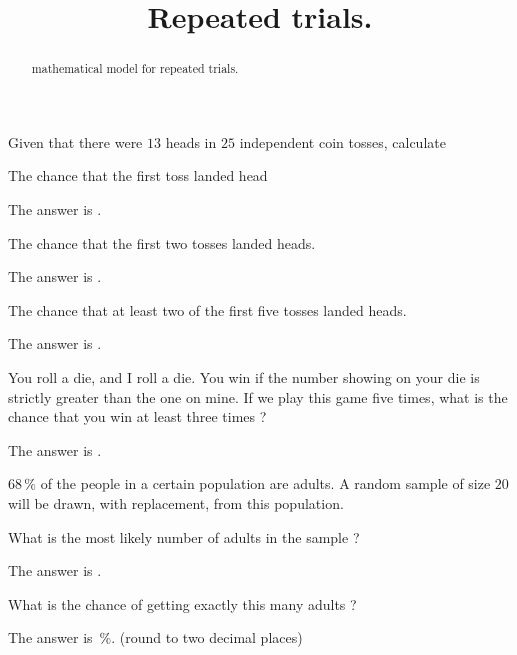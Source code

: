 \documentclass{ximera}
\title{Repeated trials.}
\begin{document}
\begin{abstract}
mathematical model for repeated trials.
\end{abstract}
\maketitle

Given that there were $13$ heads in $25$ independent coin tosses, calculate

\begin{question}
The chance that the first toss landed head
     \begin{solution}
          The answer is .
     \end{solution}
\end{question}

\begin{question}
The chance that the first two tosses landed heads.
     \begin{solution}
          The answer is .
     \end{solution}
\end{question}

\begin{question}
The chance that at least two of the first five tosses landed heads.
     \begin{solution}
          The answer is .
     \end{solution}
\end{question}

\begin{question}
You roll a die, and I roll a die. You win if the number showing on your die is strictly greater than the one on mine. If we play this game five times, what is the chance that you  win at least three times ?
      \begin{solution}
          The answer is .
     \end{solution}
\end{question}

$68\,\%$ of the people in a certain population are adults. A random sample of size $20$ will be drawn, with replacement, from this population. 

\begin{question}
What is the most likely number of adults in the sample ?
     \begin{solution}
          The answer is .
     \end{solution}
\end{question}

\begin{question}
What is the chance of getting exactly this many adults ?
     \begin{solution}
          The answer is  $\,\%$. (round to two decimal places)
     \end{solution}
\end{question}
\end{document}
